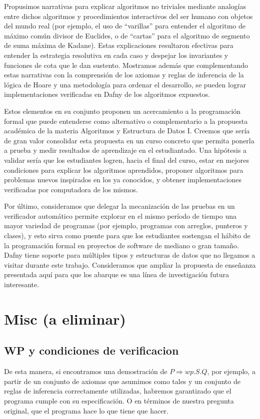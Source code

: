 \documentclass[12pt, a4paper, openany, fleqn]{book}
\begin{document}
    Propusimos narrativas para explicar algoritmos no triviales mediante analogías entre dichos algoritmos y procedimientos interactivos del ser humano con objetos del mundo real (por ejemplo, el uso de ``varillas'' para entender el algoritmo de máximo común divisor de Euclides, o de ``cartas'' para el algoritmo de segmento de suma máxima de Kadane). Estas explicaciones resultaron efectivas para entender la estrategia resolutiva en cada caso y despejar los invariantes y funciones de cota que le dan sustento. Mostramos además que complementando estas narrativas con la comprensión de los axiomas y reglas de inferencia de la lógica de Hoare y una metodología para ordenar el desarrollo, se pueden lograr implementaciones verificadas en Dafny de los algoritmos expuestos.

    Estos elementos en su conjunto proponen un acercamiento a la programación formal que puede entenderse como alternativo o complementario a la propuesta académica de la materia Algoritmos y Estructura de Datos I. Creemos que sería de gran valor consolidar esta propuesta en un curso concreto que permita ponerla a prueba y medir resultados de aprendizaje en el estudiantado. Una hipótesis a validar sería que los estudiantes logren, hacia el final del curso, estar en mejores condiciones para explicar los algoritmos aprendidos, proponer algoritmos para problemas nuevos inspirados en los ya conocidos, y obtener implementaciones verificadas por computadora de los mismos.

    Por último, consideramos que delegar la mecanización de las pruebas en un verificador automático permite explorar en el mismo período de tiempo una mayor variedad de programas (por ejemplo, programas con arreglos, punteros y clases), y esto sirva como puente para que los estudiantes sostengan el hábito de la programación formal en proyectos de software de mediano o gran tamaño. Dafny tiene soporte para múltiples tipos y estructuras de datos que no llegamos a visitar durante este trabajo. Consideramos que ampliar la propuesta de enseñanza presentada aquí para que los abarque es una línea de investigación futura interesante.

    \chapter{Misc (a eliminar)}

    \section{WP y condiciones de verificacion}
    De esta manera, si encontramos una demostración de $P \Rightarrow wp.S.Q$, por ejemplo, a partir de un conjunto de axiomas que asumimos como tales y un conjunto de reglas de inferencia correctamente utilizadas, habremos garantizado que el programa cumple con su especificación. O en términos de nuestra pregunta original, que el programa hace lo que tiene que hacer.
\end{document}
